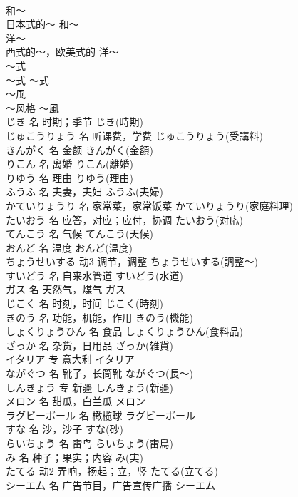 \documentclass[8pt]{extreport}
\begin{document}
\begin{CJK}{UTF8}{min}
\\	和～	
\\	日本式的～	和～	
\\	洋～	
\\	西式的～，欧美式的	洋～	
\\	～式	
\\	～式	～式	
\\	～風	
\\	～风格	～風	
\\	じき	名	时期；季节	じき(時期)	
\\	じゅこうりょう	名	听课费，学费	じゅこうりょう(受講料)	
\\	きんがく	名	金额	きんがく(金額)	
\\	りこん	名	离婚	りこん(離婚)	
\\	りゆう	名	理由	りゆう(理由)	
\\	ふうふ	名	夫妻，夫妇	ふうふ(夫婦)	
\\	かていりょうり	名	家常菜，家常饭菜	かていりょうり(家庭料理)	
\\	たいおう	名	应答，对应；应付，协调	たいおう(対応)	
\\	てんこう	名	气候	てんこう(天候)	
\\	おんど	名	温度	おんど(温度)	
\\	ちょうせいする	动3	调节，调整	ちょうせいする(調整～)	
\\	すいどう	名	自来水管道	すいどう(水道)	
\\	ガス	名	天然气，煤气	ガス	
\\	じこく	名	时刻，时间	じこく(時刻)	
\\	きのう	名	功能，机能，作用	きのう(機能)	
\\	しょくりょうひん	名	食品	しょくりょうひん(食料品)	
\\	ざっか	名	杂货，日用品	ざっか(雑貨)	
\\	イタリア	专	意大利	イタリア	
\\	ながぐつ	名	靴子，长筒靴	ながぐつ(長～)	
\\	しんきょう	专	新疆	しんきょう(新疆)	
\\	メロン	名	甜瓜，白兰瓜	メロン	
\\	ラグビーボール	名	橄榄球	ラグビーボール	
\\	すな	名	沙，沙子	すな(砂)	
\\	らいちょう	名	雷鸟	らいちょう(雷鳥)	
\\	み	名	种子；果实；内容	み(実)	
\\	たてる	动2	弄响，扬起；立，竖	たてる(立てる)	
\\	シーエム	名	广告节目，广告宣传广播	シーエム

\end{CJK}
\end{document}
